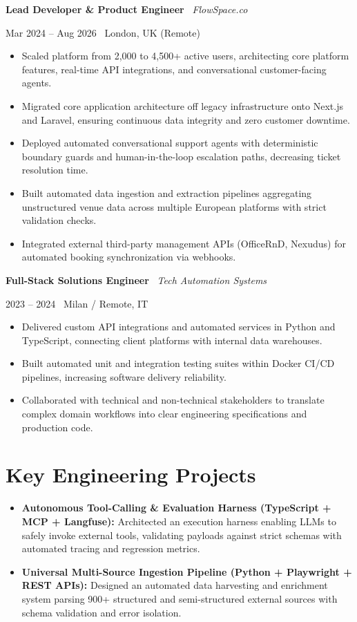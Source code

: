 \documentclass[a4paper,10pt]{article}
\newcommand{\role}[4]{%
  \vspace{2pt}\noindent
  \begin{minipage}[t]{0.70\textwidth}\raggedright\textbf{#1} \textbullet\ \textit{#3}\end{minipage}%
  \hfill
  \begin{minipage}[t]{0.28\textwidth}\raggedleft\footnotesize\color{gray}#2 \textbullet\ #4\end{minipage}%
  \vspace{1pt}%
}
\begin{document}
\vspace{3pt}
\role{Lead Developer \& Product Engineer}{Mar 2024 -- Aug 2026}{FlowSpace.co}{London, UK (Remote)}
\begin{itemize}
  \item Scaled platform from 2,000 to 4,500+ active users, architecting core platform features, real-time API integrations, and conversational customer-facing agents.
  \item Migrated core application architecture off legacy infrastructure onto Next.js and Laravel, ensuring continuous data integrity and zero customer downtime.
  \item Deployed automated conversational support agents with deterministic boundary guards and human-in-the-loop escalation paths, decreasing ticket resolution time.
  \item Built automated data ingestion and extraction pipelines aggregating unstructured venue data across multiple European platforms with strict validation checks.
  \item Integrated external third-party management APIs (OfficeRnD, Nexudus) for automated booking synchronization via webhooks.
\end{itemize}

\vspace{3pt}
\role{Full-Stack Solutions Engineer}{2023 -- 2024}{Tech Automation Systems}{Milan / Remote, IT}
\begin{itemize}
  \item Delivered custom API integrations and automated services in Python and TypeScript, connecting client platforms with internal data warehouses.
  \item Built automated unit and integration testing suites within Docker CI/CD pipelines, increasing software delivery reliability.
  \item Collaborated with technical and non-technical stakeholders to translate complex domain workflows into clear engineering specifications and production code.
\end{itemize}

\section{Key Engineering Projects}
\begin{itemize}
  \item \textbf{Autonomous Tool-Calling \& Evaluation Harness (TypeScript + MCP + Langfuse):} Architected an execution harness enabling LLMs to safely invoke external tools, validating payloads against strict schemas with automated tracing and regression metrics.
  \item \textbf{Universal Multi-Source Ingestion Pipeline (Python + Playwright + REST APIs):} Designed an automated data harvesting and enrichment system parsing 900+ structured and semi-structured external sources with schema validation and error isolation.
\end{itemize}
\end{document}
